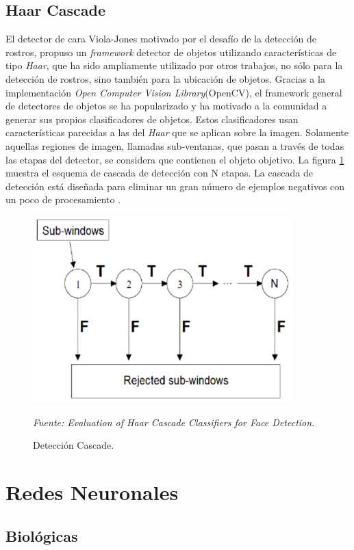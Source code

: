 \subsection{Haar Cascade}
El detector de cara Viola-Jones motivado por el desafío de la detección de rostros, propuso un \textit{framework} detector de objetos utilizando características de tipo \textit{Haar}, que ha sido ampliamente utilizado por otros trabajos, no sólo para la detección de rostros, sino también para la ubicación de objetos. Gracias a la implementación \textit{Open Computer Vision Library}(OpenCV), el framework general de detectores de objetos se ha popularizado y ha motivado a la comunidad a generar sus propios clasificadores de objetos. Estos clasificadores usan características parecidas a las del \textit{Haar} que se aplican sobre la imagen. Solamente aquellas regiones de imagen, llamadas sub-ventanas, que pasan a través de todas las etapas del detector, se considera que contienen el objeto objetivo. La figura \ref{fig:deteccion_cascade} muestra el esquema de cascada de detección con N etapas. La cascada de detección está diseñada para eliminar un gran número de ejemplos negativos con un poco de
procesamiento \cite{20padilla2012evaluation}.

\begin{figure}[H]
		\centering
		\includegraphics[width=100mm]{./Imagenes/deteccion_cascade.png}
		\caption{Detección Cascade.}
		\vspace{0.15cm}
		\textit{Fuente: Evaluation of Haar Cascade Classifiers for Face Detection.}
		\label{fig:deteccion_cascade}
\end{figure} 

\section{Redes Neuronales}
\subsection{Biológicas}

